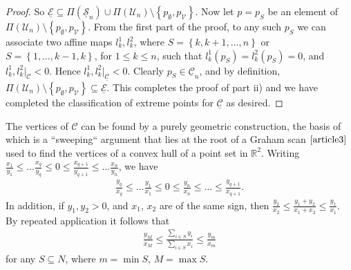 \documentclass{article}
\theoremstyle{case}
\begin{document}
\begin{proof}
So $\underline{\mathcal{E}} \subseteq \Pi\left( \underline{\mathcal{S}}_n\right) \cup \Pi\left( \mathcal{U}_n\right) \setminus{\left\lbrace p_\emptyset, p_{\mathcal{V}}\right\rbrace }$. Now let $p = p_S$ be an element of $\Pi\left( \mathcal{U}_n\right) \setminus{\left\lbrace p_\emptyset, p_{\mathcal{V}}\right\rbrace }$. From the first part of the proof, to any such $p_S$ we can associate two affine maps $l_k^1, l_k^2$, where $S = \left\lbrace k, k+1, \dots, n\right\rbrace$ or $S = \left\lbrace 1, \dots, k-1, k\right\rbrace$, for $1 \leq k \leq n$, such that $l_k^1\left( p_S\right) = l_k^2\left( p_S\right) = 0$, and $l_k^1, l_k^2 \vert_{\mathcal{C}} < 0$. Hence $l_k^1, l_k^2 \vert_{\mathcal{\underline{C}}} < 0$. Clearly $p_S \in \underline{\mathcal{C}}_n$, and by definition, $ \Pi\left( \mathcal{U}_n\right) \setminus{\left\lbrace p_\emptyset, p_{\mathcal{V}}\right\rbrace } \subseteq \underline{\mathcal{E}}$. This completes the proof of part ii) and we have completed the classification of extreme points for $\underline{\mathcal{C}}$ as desired.
\end{proof}

\vspace{6pt} 
The vertices of $\mathcal{C}$ can be found by a purely geometric construction, the basis of which is a ``sweeping`` argument that lies at the root of a Graham scan $\cite{article3}$ used to find the vertices of a convex hull of a point set in $\mathbb{R}^2$. Writing $\frac{x_1}{y_1} \leq \dots \frac{x_q}{y_q} \leq 0 \leq \frac{x_{q+1}}{y_{q+1}} \leq \dots \frac{x_n}{y_n}$, we have 
\begin{align} \label{eq7}
\frac{y_q}{x_q} \leq \dots \frac{y_1}{x_1} \leq 0 \leq \frac{y_n}{x_n} \leq \dots \leq \frac{y_{q+1}}{x_{q+1}}.
\end{align} 
In addition, if $y_1, y_2 > 0$, and $x_1$, $x_2$ are of the same sign, then $\frac{y_2}{x_2} \leq \frac{y_1+y_2}{x_1+x_2} \leq \frac{y_1}{x_1}.$ By repeated application it follows that
\begin{align} \label{eq8}
\frac{y_M}{x_M} \leq \frac{\sum_{i \in S}y_i}{\sum_{i \in S}x_i} \leq \frac{y_m}{x_m}
\end{align}
for any $S \subseteq N$, where $m = \min S$, $M = \max S$. 
\end{document}
